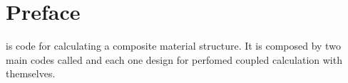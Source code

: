 \chapter*{Preface}

\par
\sputnik is code for calculating a composite material structure. It is composed by two main codes called \macro and
\micro each one design for perfomed coupled calculation with themselves.


